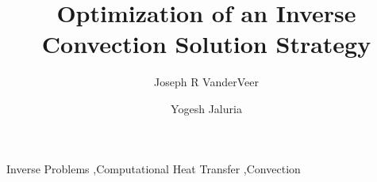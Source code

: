\documentclass[preprint,12pt]{elsarticle}
\begin{document}
\begin{frontmatter}
\title{Optimization of an Inverse Convection Solution Strategy}

\author{Joseph R VanderVeer}
\author{Yogesh Jaluria}

\address{Department of Mechanical and Aerospace Engineering: Rutgers University, 98 Brett Rd, Piscataway NJ, 08854}



\begin{abstract}



\end{abstract}
\begin{keyword}
Inverse Problems \sep Computational Heat Transfer \sep Convection
\end{keyword}
\end{frontmatter}


\newlength\figureheight 
\newlength\figurewidth 
	
	
	
\end{document}
